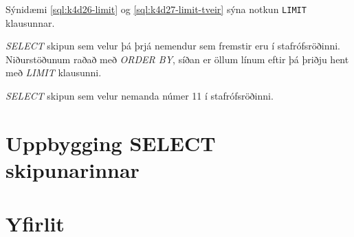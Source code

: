 Sýnidæmi \ref{sql:k4d26-limit} og \ref{sql:k4d27-limit-tveir} sýna notkun \verb|LIMIT| klausunnar.

\begin{example}
\caption[LIMIT]{\emph{SELECT} skipun sem velur þá þrjá nemendur sem fremstir eru í stafrófsröðinni. Niðurstöðunum raðað með \emph{ORDER BY}, síðan er öllum línum eftir þá þriðju hent með \emph{LIMIT} klausunni.}
\label{sql:k4d26-limit}
\centering
{}
\end{example}

\begin{example}
\caption[LIMIT með tveimur tölum]{\emph{SELECT} skipun sem velur nemanda númer 11 í stafrófsröðinni.}
\label{sql:k4d27-limit-tveir}
\centering
{}
\end{example}
\section{Uppbygging SELECT skipunarinnar}
\section{Yfirlit}